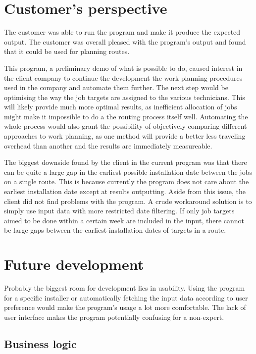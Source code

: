 \section{Customer's perspective}

The customer was able to run the program and make it produce the expected output. The customer was overall pleased with the program's output and found that it could be used for planning routes. 

This program, a preliminary demo of what is possible to do, caused interest in the client company to continue the development the work planning procedures used in the company and automate them further. The next step would be optimising the way the job targets are assigned to the various technicians. This will likely provide much more optimal results, as inefficient allocation of jobs might make it impossible to do a the routing process itself well. Automating the whole process would also grant the possibility of objectively comparing different approaches to work planning, as one method will provide a better less traveling overhead than another and the results are immediately measureable.   

The biggest downside found by the client in the current program was that there can be quite a large gap in the earliest possible installation date between the jobs on a single route. This is because currently the program does not care about the earliest installation date except at results outputting. Aside from this issue, the client did not find problems with the program. A crude workaround solution is to simply use input data with more restricted date filtering. If only job targets aimed to be done within a certain week are included in the input, there cannot be large gaps between the earliest installation dates of targets in a route.  



\section{Future development}

Probably the biggest room for development lies in usability. Using the program for a specific installer or automatically fetching the input data according to user preference would make the program's usage a lot more comfortable. The lack of user interface makes the program potentially confusing for a non-expert.


\subsection{Business logic}

